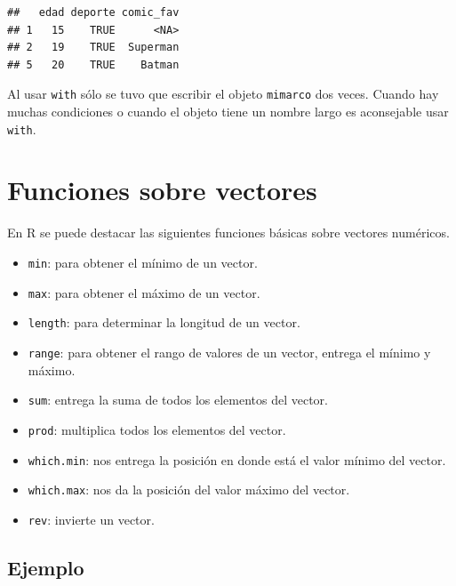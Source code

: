 \documentclass[
]{book}
\providecommand{\tightlist}{%
  \setlength{\itemsep}{0pt}\setlength{\parskip}{0pt}}
\begin{document}
\begin{verbatim}
##   edad deporte comic_fav
## 1   15    TRUE      <NA>
## 2   19    TRUE  Superman
## 5   20    TRUE    Batman
\end{verbatim}

Al usar \texttt{with} sólo se tuvo que escribir el objeto \texttt{mimarco} dos veces. Cuando hay muchas condiciones o cuando el objeto tiene un nombre largo es aconsejable usar \texttt{with}.

\hypertarget{funciones-sobre-vectores}{%
\section{Funciones sobre vectores}\label{funciones-sobre-vectores}}

En R se puede destacar las siguientes funciones básicas sobre vectores numéricos.

\begin{itemize}
\tightlist
\item
  \texttt{min}: para obtener el mínimo de un vector.\\
\item
  \texttt{max}: para obtener el máximo de un vector.\\
\item
  \texttt{length}: para determinar la longitud de un vector.\\
\item
  \texttt{range}: para obtener el rango de valores de un vector, entrega el mínimo y máximo.\\
\item
  \texttt{sum}: entrega la suma de todos los elementos del vector.\\
\item
  \texttt{prod}: multiplica todos los elementos del vector.\\
\item
  \texttt{which.min}: nos entrega la posición en donde está el valor mínimo del vector.\\
\item
  \texttt{which.max}: nos da la posición del valor máximo del vector.
\item
  \texttt{rev}: invierte un vector.
\end{itemize}

\hypertarget{ejemplo-9}{%
\subsection*{Ejemplo}\label{ejemplo-9}}
\end{document}
